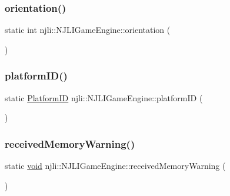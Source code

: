 \subsubsection{\texorpdfstring{orientation()}{orientation()}}
{\footnotesize\ttfamily static int njli\+::\+N\+J\+L\+I\+Game\+Engine\+::orientation (\begin{DoxyParamCaption}{ }\end{DoxyParamCaption})\hspace{0.3cm}{\ttfamily [static]}}

\mbox{\label{classnjli_1_1_n_j_l_i_game_engine_a84194db2322fdba0ce7942f4fbb4a345}} 
\subsubsection{\texorpdfstring{platform\+I\+D()}{platformID()}}
{\footnotesize\ttfamily static \mbox{\hyperlink{classnjli_1_1_n_j_l_i_game_engine_a5a2bbb7c337d3918056ba12307f2a4ed}{Platform\+ID}} njli\+::\+N\+J\+L\+I\+Game\+Engine\+::platform\+ID (\begin{DoxyParamCaption}{ }\end{DoxyParamCaption})\hspace{0.3cm}{\ttfamily [static]}}

\mbox{\label{classnjli_1_1_n_j_l_i_game_engine_ae2c3d2427e9e19edefd222c692143975}} 
\subsubsection{\texorpdfstring{received\+Memory\+Warning()}{receivedMemoryWarning()}}
{\footnotesize\ttfamily static \mbox{\hyperlink{_thread_8h_af1e856da2e658414cb2456cb6f7ebc66}{void}} njli\+::\+N\+J\+L\+I\+Game\+Engine\+::received\+Memory\+Warning (\begin{DoxyParamCaption}{ }\end{DoxyParamCaption})\hspace{0.3cm}{\ttfamily [static]}}

